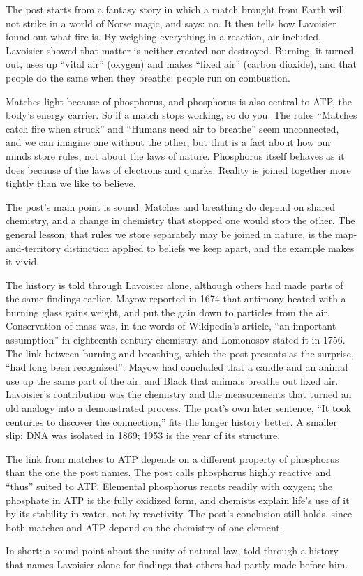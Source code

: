 \begin{afterword}
\summaryhead

The post starts from a fantasy story in which a match brought from Earth will not strike in a world of Norse magic, and says: no. It then tells how Lavoisier found out what fire is. By weighing everything in a reaction, air included, Lavoisier showed that matter is neither created nor destroyed. Burning, it turned out, uses up ``vital air'' (oxygen) and makes ``fixed air'' (carbon dioxide), and that people do the same when they breathe: people run on combustion.

Matches light because of phosphorus, and phosphorus is also central to ATP, the body's energy carrier. So if a match stops working, so do you. The rules ``Matches catch fire when struck'' and ``Humans need air to breathe'' seem unconnected, and we can imagine one without the other, but that is a fact about how our minds store rules, not about the laws of nature. Phosphorus itself behaves as it does because of the laws of electrons and quarks. Reality is joined together more tightly than we like to believe.

\responsehead

The post's main point is sound. Matches and breathing do depend on shared chemistry, and a change in chemistry that stopped one would stop the other. The general lesson, that rules we store separately may be joined in nature, is the map-and-territory distinction applied to beliefs we keep apart, and the example makes it vivid.

The history is told through Lavoisier alone, although others had made parts of the same findings earlier. Mayow reported in 1674 that antimony heated with a burning glass gains weight, and put the gain down to particles from the air. Conservation of mass was, in the words of Wikipedia's article, ``an important assumption'' in eighteenth-century chemistry, and Lomonosov stated it in 1756. The link between burning and breathing, which the post presents as the surprise, ``had long been recognized'': Mayow had concluded that a candle and an animal use up the same part of the air, and Black that animals breathe out fixed air. Lavoisier's contribution was the chemistry and the measurements that turned an old analogy into a demonstrated process. The post's own later sentence, ``It took centuries to discover the connection,'' fits the longer history better. A smaller slip: DNA was isolated in 1869; 1953 is the year of its structure.

The link from matches to ATP depends on a different property of phosphorus than the one the post names. The post calls phosphorus highly reactive and ``thus'' suited to ATP. Elemental phosphorus reacts readily with oxygen; the phosphate in ATP is the fully oxidized form, and chemists explain life's use of it by its stability in water, not by reactivity. The post's conclusion still holds, since both matches and ATP depend on the chemistry of one element.

In short: a sound point about the unity of natural law, told through a history that names Lavoisier alone for findings that others had partly made before him.
\end{afterword}

